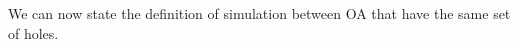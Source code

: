 \documentclass[runningheads]{llncs}
\begin{document}
We can now state the definition of simulation between OA that have the same set of holes. 
\end{document}
